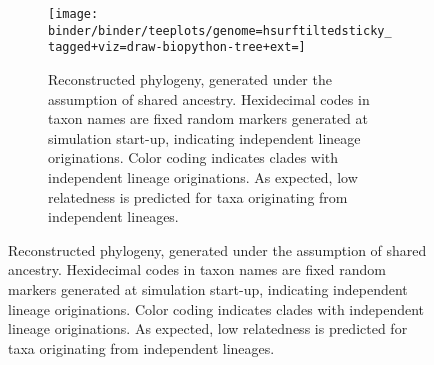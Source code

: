 \begin{figure}[htbp]
    \centering

    \begin{subfigure}[b]{\textwidth}
        \texttt{[image: binder/binder/teeplots/genome=hsurftiltedsticky\_tagged+viz=draw-biopython-tree+ext=]}
        \caption{%
          Reconstructed phylogeny, generated under the assumption of shared ancestry.
          Hexidecimal codes in taxon names are fixed random markers generated at simulation start-up, indicating independent lineage originations.
          Color coding indicates clades with independent lineage originations.
          As expected, low relatedness is predicted for taxa originating from independent lineages.
        } \label{fig:validation-example:phylogeny}
    \end{subfigure}

    \vspace{10pt}


\end{figure}
